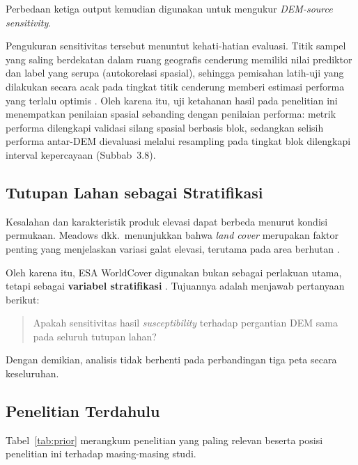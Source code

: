\documentclass[12pt]{article}
\begin{document}
Perbedaan ketiga output kemudian digunakan untuk mengukur
\textit{DEM-source sensitivity}.

Pengukuran sensitivitas tersebut menuntut kehati-hatian evaluasi. Titik
sampel yang saling berdekatan dalam ruang geografis cenderung memiliki
nilai prediktor dan label yang serupa (autokorelasi spasial), sehingga
pemisahan latih-uji yang dilakukan secara acak pada tingkat titik
cenderung memberi estimasi performa yang terlalu optimis
\cite{roberts2017,ploton2020}. Oleh karena itu, uji ketahanan hasil pada
penelitian ini menempatkan penilaian spasial sebanding dengan penilaian
performa: metrik performa dilengkapi validasi silang spasial berbasis blok,
sedangkan selisih performa antar-DEM dievaluasi melalui resampling pada
tingkat blok dilengkapi interval kepercayaan (Subbab~3.8).

\subsection{Tutupan Lahan sebagai Stratifikasi}

Kesalahan dan karakteristik produk elevasi dapat berbeda menurut kondisi
permukaan. Meadows dkk.\ menunjukkan bahwa \textit{land cover} merupakan
faktor penting yang menjelaskan variasi galat elevasi, terutama pada area
berhutan \cite{meadows2024}.

Oleh karena itu, ESA WorldCover digunakan bukan sebagai perlakuan utama,
tetapi sebagai \textbf{variabel stratifikasi} \cite{zanaga2021}. Tujuannya
adalah menjawab pertanyaan berikut:

\begin{quote}
Apakah sensitivitas hasil \textit{susceptibility} terhadap pergantian DEM
sama pada seluruh tutupan lahan?
\end{quote}

Dengan demikian, analisis tidak berhenti pada perbandingan tiga peta secara
keseluruhan.

\subsection{Penelitian Terdahulu}

Tabel~\ref{tab:prior} merangkum penelitian yang paling relevan beserta
posisi penelitian ini terhadap masing-masing studi.
\end{document}
